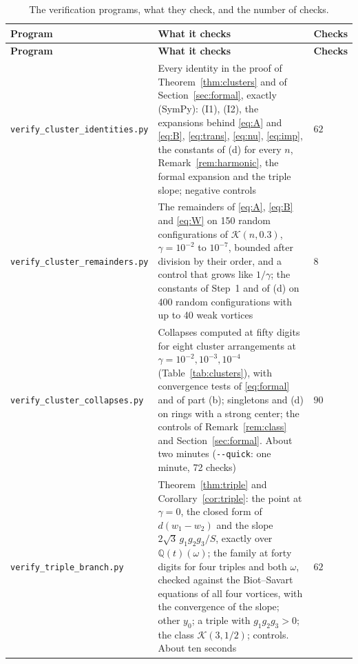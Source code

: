 \documentclass[11pt]{article}
\theoremstyle{definition}
\newcommand{\Q}{\mathbb{Q}}
\newcommand{\K}{\mathcal{K}}
\begin{document}
{\small
\renewcommand{\arraystretch}{1.2}
\begin{longtable}{|>{\raggedright\arraybackslash}p{}|>{\raggedright\arraybackslash}p{}|>{\raggedleft\arraybackslash}p{}|}
\caption{The verification programs, what they check, and the number of checks.}\label{tab:checks}\\
  \hline
  \textbf{Program} & \textbf{What it checks} & \textbf{Checks} \\ \hline
  \endfirsthead
  \hline
  \textbf{Program} & \textbf{What it checks} & \textbf{Checks} \\ \hline
  \endhead
  \texttt{verify\_\allowbreak cluster\_\allowbreak identities.py} & Every identity in the proof of Theorem~\ref{thm:clusters} and of Section~\ref{sec:formal}, exactly (SymPy): (I1), (I2), the expansions behind \eqref{eq:A} and \eqref{eq:B}, \eqref{eq:trans}, \eqref{eq:nu}, \eqref{eq:imp}, the constants of (d) for every $n$, Remark~\ref{rem:harmonic}, the formal expansion and the triple slope; negative controls & $62$ \\ \hline
  \texttt{verify\_\allowbreak cluster\_\allowbreak remainders.py} & The remainders of \eqref{eq:A}, \eqref{eq:B} and \eqref{eq:W} on 150 random configurations of $\K(n, 0.3)$, $\gamma = 10^{-2}$ to $10^{-7}$, bounded after division by their order, and a control that grows like $1/\gamma$; the constants of Step~1 and of (d) on 400 random configurations with up to 40 weak vortices & $8$ \\ \hline
  \texttt{verify\_\allowbreak cluster\_\allowbreak collapses.py} & Collapses computed at fifty digits for eight cluster arrangements at $\gamma = 10^{-2}, 10^{-3}, 10^{-4}$ (Table~\ref{tab:clusters}), with convergence tests of \eqref{eq:formal} and of part (b); singletons and (d) on rings with a strong center; the controls of Remark~\ref{rem:class} and Section~\ref{sec:formal}. About two minutes (\texttt{-{}-quick}: one minute, 72 checks) & $90$ \\ \hline
  \texttt{verify\_\allowbreak triple\_\allowbreak branch.py} & Theorem~\ref{thm:triple} and Corollary~\ref{cor:triple}: the point at $\gamma = 0$, the closed form of $d(w_1 - w_2)$ and the slope $2\sqrt{3}\,g_1g_2g_3/S$, exactly over $\Q(t)(\omega)$; the family at forty digits for four triples and both $\omega$, checked against the Biot--Savart equations of all four vortices, with the convergence of the slope; other $y_0$; a triple with $g_1g_2g_3 > 0$; the class $\K(3, 1/2)$; controls. About ten seconds & $62$ \\ \hline

\end{longtable}}
\end{document}
